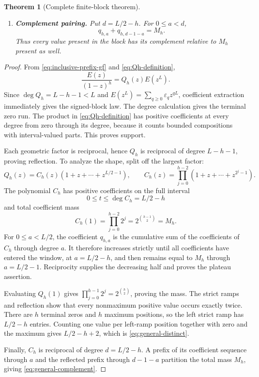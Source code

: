 \documentclass[11pt,oneside]{article}
\numberwithin{equation}{section}
\newtheorem{theorem}{Theorem}[section]
\theoremstyle{definition}
\theoremstyle{remark}
\newcommand{\eps}{\varepsilon}
\begin{document}
\begin{theorem}[Complete finite-block theorem]
\begin{enumerate}
\item \textbf{Complement pairing.}  Put \(d=L/2-h\).  For
\(0\le a<d\),
\begin{equation}
 \boxed{q_{h,a}+q_{h,d-1-a}=M_h.}
 \label{eq:general-complement}
\end{equation}
Thus every value present in the block has its complement relative to \(M_h\)
present as well.
\end{enumerate}
\end{theorem}

\begin{proof}
From \eqref{eq:inclusive-prefix-gf} and \eqref{eq:Qh-definition},
\begin{equation}
 \frac{E(z)}{(1-z)^h}=Q_h(z)E(z^L).
 \label{eq:block-factorization}
\end{equation}
Since \(\deg Q_h=L-h-1<L\) and
\(E(z^L)=\sum_{q\ge0}\eps_qz^{qL}\), coefficient extraction immediately
gives the signed-block law.  The degree calculation gives the terminal zero
run.  The product in \eqref{eq:Qh-definition} has positive coefficients at
every degree from zero through its degree, because it counts bounded
compositions with interval-valued parts.  This proves support.

Each geometric factor is reciprocal, hence \(Q_h\) is reciprocal of degree
\(L-h-1\), proving reflection.  To analyze the shape, split off the largest
factor:
\begin{equation}
 Q_h(z)=C_h(z)(1+z+\cdots+z^{L/2-1}),
 \qquad
 C_h(z)=\prod_{j=0}^{h-2}(1+z+\cdots+z^{2^j-1}).
 \label{eq:Ch-split}
\end{equation}
The polynomial \(C_h\) has positive coefficients on the full interval
\begin{equation}
 0\le t\le\deg C_h=L/2-h
 \label{eq:Ch-degree}
\end{equation}
and total coefficient mass
\begin{equation}
 C_h(1)=\prod_{j=0}^{h-2}2^j
 =2^{\binom{h-1}{2}}=M_h.
 \label{eq:Ch-mass}
\end{equation}
For \(0\le a<L/2\), the coefficient \(q_{h,a}\) is the cumulative sum of
the coefficients of \(C_h\) through degree \(a\).  It therefore increases
strictly until all coefficients have entered the window, at
\(a=L/2-h\), and then remains equal to \(M_h\) through \(a=L/2-1\).
Reciprocity supplies the decreasing half and proves the plateau assertion.

Evaluating \(Q_h(1)\) gives
\(
\prod_{j=0}^{h-1}2^j=2^{\binom h2}
\), proving the mass.  The strict ramps and reflection show that every
nonmaximum positive value occurs exactly twice.  There are \(h\) terminal
zeros and \(h\) maximum positions, so the left strict ramp has
\(L/2-h\) entries.  Counting one value per left-ramp position together with
zero and the maximum gives \(L/2-h+2\), which is
\eqref{eq:general-distinct}.

Finally, \(C_h\) is reciprocal of degree \(d=L/2-h\).  A prefix of its
coefficient sequence through \(a\) and the reflected prefix through
\(d-1-a\) partition the total mass \(M_h\), giving
\eqref{eq:general-complement}.
\end{proof}
\end{document}
